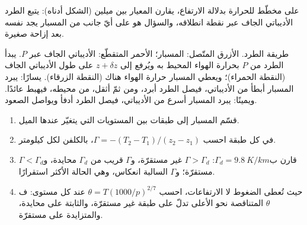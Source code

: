 على مخطّط للحرارة بدلالة الارتفاع، يقارن المعيار بين ميلين (الشكل أدناه): يتبع الطرد الأديباتي الجاف عبر نقطة انطلاقه، والسؤال هو على أيّ جانب من المسبار يجد نفسه بعد إزاحة صغيرة.

\begin{omfigure}

{\small طريقة الطرد. الأزرق المتّصل: المسبار؛ الأحمر المتقطّع: الأديباتي الجاف عبر $P$. يبدأ الطرد من $P$ بحرارة الهواء المحيط به ويُرفع إلى $z + \delta z$ على طول الأديباتي الجاف (النقطة الحمراء)؛ ويعطي المسبار حرارة الهواء هناك (النقطة الزرقاء). يسارًا: يبرد المسبار أبطأ من الأديباتي، فيصل الطرد أبرد، ومن ثمّ أثقل، من محيطه، فيهبط عائدًا. ويمينًا: يبرد المسبار أسرع من الأديباتي، فيصل الطرد أدفأ ويواصل الصعود.}
\label{fig:b1:fluid-envelopes-structure:parcel}
\end{omfigure}

\begin{method}\label{met:b1:fluid-envelopes-structure:sounding}
\begin{enumerate}
  \item قسّم المسبار إلى طبقات بين المستويات التي يتغيّر عندها الميل.
  \item في كل طبقة احسب $\Gamma = -(T_2 - T_1)/(z_2 - z_1)$، بالكلفن لكل كيلومتر.
  \item قارن ب$\Gamma_d = \qty{9.8}{K/km}$: $\Gamma > \Gamma_d$ غير مستقرّة، و$\Gamma$ قريب من $\Gamma_d$ محايدة، و$\Gamma < \Gamma_d$ مستقرّة؛ و$\Gamma$ السالبة انعكاس، وهي الحالة الأكثر استقرارًا.
  \item حيث تُعطى الضغوط لا الارتفاعات، احسب $\theta =
        T(1000/p)^{2/7}$ عند كل مستوى: ف$\theta$ المتناقصة نحو الأعلى تدلّ على طبقة غير مستقرّة، والثابتة على محايدة، والمتزايدة على مستقرّة.
\end{enumerate}
\end{method}

